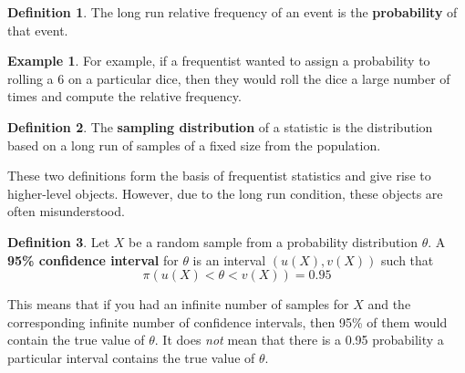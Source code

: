 \documentclass[
]{book}
\theoremstyle{definition}
\newtheorem{definition}{Definition}[chapter]
\theoremstyle{definition}
\newtheorem{example}{Example}[chapter]
\theoremstyle{definition}
\theoremstyle{definition}
\theoremstyle{remark}
\begin{document}
\begin{definition}
The long run relative frequency of an event is the \textbf{probability} of that event.
\end{definition}

\begin{example}
For example, if a frequentist wanted to assign a probability to rolling a 6 on a particular dice, then they would roll the dice a large number of times and compute the relative frequency.
\end{example}

\begin{definition}
The \textbf{sampling distribution} of a statistic is the distribution based on a long run of samples of a fixed size from the population.
\end{definition}

These two definitions form the basis of frequentist statistics and give rise to higher-level objects. However, due to the long run condition, these objects are often misunderstood.

\begin{definition}
Let \(X\) be a random sample from a probability distribution \(\theta\). A \textbf{95\% confidence interval} for \(\theta\) is an interval \((u(X), v(X))\) such that
\[
\pi(u(X) < \theta < v(X)) = 0.95
\]
\end{definition}

This means that if you had an infinite number of samples for \(X\) and the corresponding infinite number of confidence intervals, then 95\% of them would contain the true value of \(\theta\). It does \emph{not} mean that there is a 0.95 probability a particular interval contains the true value of \(\theta\).
\end{document}
